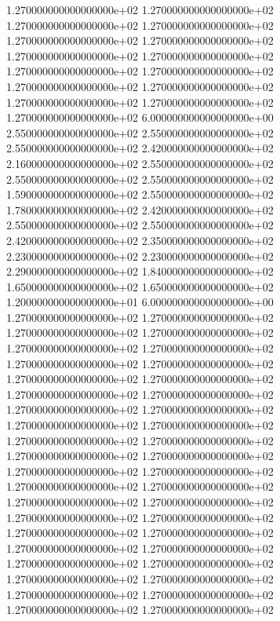 1.270000000000000000e+02 1.270000000000000000e+02 1.270000000000000000e+02 1.270000000000000000e+02 1.270000000000000000e+02 1.270000000000000000e+02 1.270000000000000000e+02 1.270000000000000000e+02 1.270000000000000000e+02 1.270000000000000000e+02 1.270000000000000000e+02 1.270000000000000000e+02 1.270000000000000000e+02 1.270000000000000000e+02 1.270000000000000000e+02 6.000000000000000000e+00 2.550000000000000000e+02 2.550000000000000000e+02 2.550000000000000000e+02 2.420000000000000000e+02 2.160000000000000000e+02 2.550000000000000000e+02 2.550000000000000000e+02 2.550000000000000000e+02 1.590000000000000000e+02 2.550000000000000000e+02 1.780000000000000000e+02 2.420000000000000000e+02 2.550000000000000000e+02 2.550000000000000000e+02 2.420000000000000000e+02 2.350000000000000000e+02 2.230000000000000000e+02 2.230000000000000000e+02 2.290000000000000000e+02 1.840000000000000000e+02 1.650000000000000000e+02 1.650000000000000000e+02 1.200000000000000000e+01 6.000000000000000000e+00 1.270000000000000000e+02 1.270000000000000000e+02 1.270000000000000000e+02 1.270000000000000000e+02 1.270000000000000000e+02 1.270000000000000000e+02 1.270000000000000000e+02 1.270000000000000000e+02 1.270000000000000000e+02 1.270000000000000000e+02 1.270000000000000000e+02 1.270000000000000000e+02 1.270000000000000000e+02 1.270000000000000000e+02 1.270000000000000000e+02 1.270000000000000000e+02 1.270000000000000000e+02 1.270000000000000000e+02 1.270000000000000000e+02 1.270000000000000000e+02 1.270000000000000000e+02 1.270000000000000000e+02 1.270000000000000000e+02 1.270000000000000000e+02 1.270000000000000000e+02 1.270000000000000000e+02 1.270000000000000000e+02 1.270000000000000000e+02 1.270000000000000000e+02 1.270000000000000000e+02 1.270000000000000000e+02 1.270000000000000000e+02 1.270000000000000000e+02 1.270000000000000000e+02 1.270000000000000000e+02 1.270000000000000000e+02 1.270000000000000000e+02 1.270000000000000000e+02 1.270000000000000000e+02 1.270000000000000000e+02
